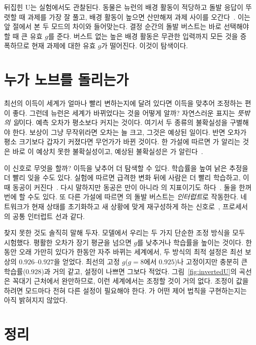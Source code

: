 뒤집힌 U는 실험에서도 관찰된다. 동물은  뉴런의 배경 활동이 적당하고 돌발 응답이 뚜렷할 때 과제를 가장 잘 풀고, 배경 활동이 높으면 산만해져 과제 사이를 오간다~\cite{AstonJones2005}. 이는 앞 절에서 본 두 모드의 차이와 들어맞는다. 결정 순간의 돌발 버스트는 바로 선택해야 할 때 큰 유효 $g$를 준다. 버스트 없는 높은 배경 활동은 무관한 입력까지 모든 것을 증폭하므로 현재 과제에 대한 유효 $g$가 떨어진다. 이것이 탐색이다.

\section{누가 노브를 돌리는가}

최선의 이득이 세계가 얼마나 빨리 변하는지에 달려 있다면 이득을 맞추어 조정하는 편이 좋다. 그런데  뉴런은 세계가 바뀌었다는 것을 어떻게 알까? 자연스러운 표지는 \emph{뜻밖의 일}이다. 예측 오차가 평소보다 커지는 것이다. 여기서 두 종류의 불확실성을 구별해야 한다. 보상이 그냥 무작위라면 오차는 늘 크고, 그것은 예상된 일이다. 반면 오차가 평소 크기보다 갑자기 커졌다면 무언가가 바뀐 것이다. 한 가설에 따르면 가 알리는 것은 바로 이 예상치 못한 불확실성이고, 예상된 불확실성은 가 알린다~\cite{YuDayan2005}.

이 신호로 무엇을 할까? 이득을 낮추어 더 탐색할 수 있다. 학습률을 높여 낡은 추정을 더 빨리 잊을 수도 있다. 실험에 따르면 급격한 변화 뒤에 사람은 더 빨리 학습하고, 이때 동공이 커진다~\cite{Nassar2012}. 다시 말하지만 동공은 만이 아니라 의 지표이기도 하다~\cite{Reimer2016}. 둘을 한꺼번에 할 수도 있다. 또 다른 가설에 따르면 의 돌발 버스트는 \emph{인터럽트}로 작동한다. 네트워크가 현재 상태를 초기화하고 새 상황에 맞게 재구성하게 하는 신호로~\cite{BouretSara2005}, 프로세서의 공통 인터럽트 선과 같다.

찾지 못한 것도 솔직히 말해 두자. 모델에서 우리는 두 가지 단순한 조정 방식을 모두 시험했다. 평활한 오차가 장기 평균을 넘으면 $g$를 낮추거나 학습률을 높이는 것이다. 한동안 오래 가만히 있다가 한동안 자주 바뀌는 세계에서, 두 방식의 최적 설정은 최선 보상의 $0.926$--$0.927$을 얻었다. 최선의 고정 $g$($g=8$에서 $0.925$)나 고정이지만 충분히 큰 학습률($0.928$)과 거의 같고, 설정이 나쁘면 그보다 적었다. 그림~\ref{fig:invertedU}의 곡선은 꼭대기 근처에서 완만하므로, 이런 세계에서는 조정할 것이 거의 없다. 조정이 값을 하려면 모드마다 전혀 다른 설정이 필요해야 한다. 가 어떤 제어 법칙을 구현하는지는 아직 밝혀지지 않았다.

\section{정리}

